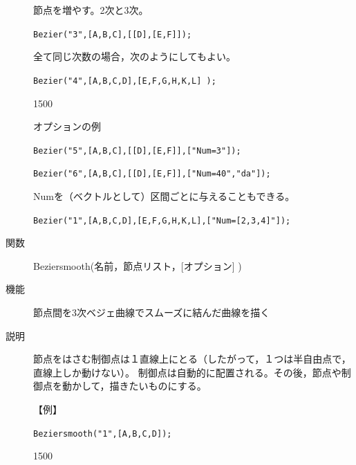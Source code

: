 \documentclass[papersize,a4paper,12pt,uplatex]{jsarticle}
\begin{document}
\begin{description}
節点を増やす。2次と3次。

\verb|Bezier("3",[A,B,C],[[D],[E,F]]);|

\vspace{20mm}

全て同じ次数の場合，次のようにしてもよい。
\newpage

\verb|Bezier("4",[A,B,C,D],[E,F,G,H,K,L] ); |

\begin{layer}{150}{0}
\end{layer}

\vspace{35mm}

オプションの例

\verb|Bezier("5",[A,B,C],[[D],[E,F]],["Num=3"]);|

\hspace{20mm}

\verb|Bezier("6",[A,B,C],[[D],[E,F]],["Num=40","da"]);|

\hspace{20mm}

Numを（ベクトルとして）区間ごとに与えることもできる。

\verb|Bezier("1",[A,B,C,D],[E,F,G,H,K,L],["Num=[2,3,4]"]);|

\hspace{10mm} 


\vspace{\baselineskip}
\hypertarget{beziersmooth}{}
\item[関数]Beziersmooth(名前，節点リスト，[オプション] )
\item[機能]節点間を3次ベジェ曲線でスムーズに結んだ曲線を描く
\item[説明]節点をはさむ制御点は１直線上にとる（したがって，１つは半自由点で，直線上しか動けない）。
制御点は自動的に配置される。その後，節点や制御点を動かして，描きたいものにする。

\vspace{\baselineskip}
【例】

\verb|Beziersmooth("1",[A,B,C,D]);|

\begin{layer}{150}{0}
\end{layer}


\end{description}
\end{document}

